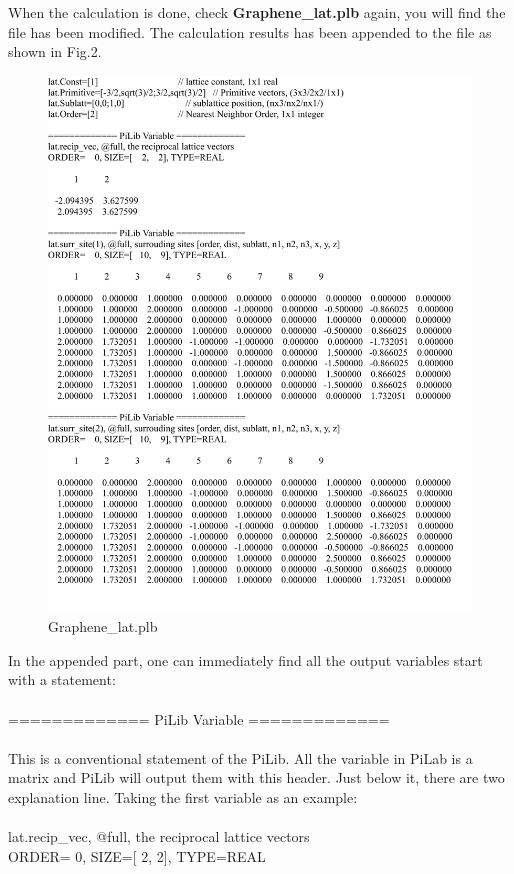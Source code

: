 \documentclass[10pt,a4paper]{article}
\begin{document}
When the calculation is done, check \textbf{Graphene\_lat.plb} again, you will find the file has been modified. The calculation results has been appended to the file as shown in Fig.2.   
\begin{figure}[tbp]
\centering
\includegraphics[width=1.0\columnwidth]{Graphene_lat.pdf}
\caption{Graphene\_lat.plb}
\end{figure}     
In the appended part, one can immediately find all the output variables start with a statement:\\ \\
============= PiLib Variable =============\\ \\
This is a conventional statement of the PiLib. All the variable in PiLab is a matrix and PiLib will output them with this header. Just below it, there are two explanation line. Taking the first variable as an example:\\ \\
lat.recip\_vec, @full, the reciprocal lattice vectors \\
ORDER=    0, SIZE=[    2,    2], TYPE=REAL    \\
\end{document}
